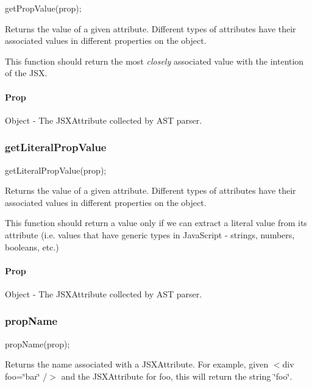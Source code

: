 \begin{DoxyCode}
getPropValue(prop);
\end{DoxyCode}
 Returns the value of a given attribute. Different types of attributes have their associated values in different properties on the object.

This function should return the most {\itshape closely} associated value with the intention of the J\+SX.

\paragraph*{Prop}

Object -\/ The J\+S\+X\+Attribute collected by A\+ST parser.





\subsubsection*{get\+Literal\+Prop\+Value}


\begin{DoxyCode}
getLiteralPropValue(prop);
\end{DoxyCode}
 Returns the value of a given attribute. Different types of attributes have their associated values in different properties on the object.

This function should return a value only if we can extract a literal value from its attribute (i.\+e. values that have generic types in Java\+Script -\/ strings, numbers, booleans, etc.)

\paragraph*{Prop}

Object -\/ The J\+S\+X\+Attribute collected by A\+ST parser.





\subsubsection*{prop\+Name}


\begin{DoxyCode}
propName(prop);
\end{DoxyCode}
 Returns the name associated with a J\+S\+X\+Attribute. For example, given {\ttfamily $<$div foo=\char`\"{}bar\char`\"{} /$>$} and the J\+S\+X\+Attribute for {\ttfamily foo}, this will return the string {\ttfamily \char`\"{}foo\char`\"{}}.

